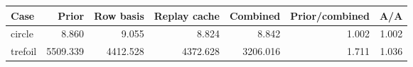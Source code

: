 \begin{tabular}{lrrrrrr}
\toprule
Case & Prior & Row basis & Replay cache & Combined & Prior/combined & A/A \\
\midrule
circle & 8.860 & 9.055 & 8.824 & 8.842 & 1.002 & 1.002 \\
trefoil & 5509.339 & 4412.528 & 4372.628 & 3206.016 & 1.711 & 1.036 \\
\bottomrule
\end{tabular}
